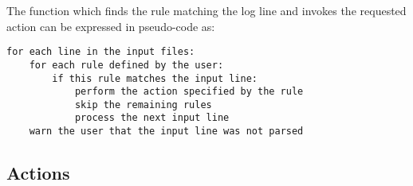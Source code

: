 \documentclass{svmult}
\begin{document}
The function which finds the rule matching the log line and invokes the
requested action can be expressed in pseudo-code as:


\begin{verbatim}
for each line in the input files: 
    for each rule defined by the user: 
        if this rule matches the input line:
            perform the action specified by the rule
            skip the remaining rules
            process the next input line
    warn the user that the input line was not parsed
\end{verbatim}

\subsection{Actions}

\label{Actions}
\end{document}
